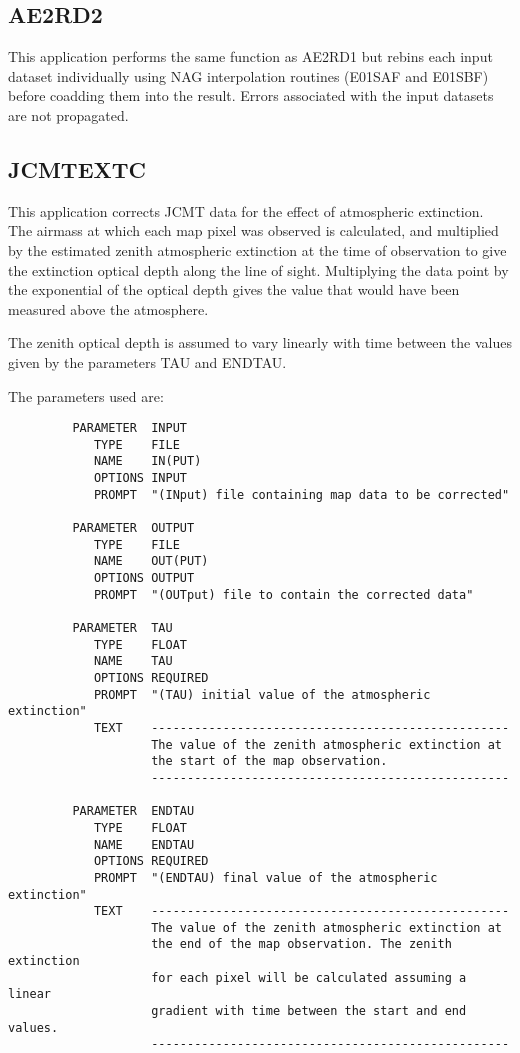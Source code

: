 \subsection{AE2RD2}

This application performs the same function as AE2RD1 but rebins each
input dataset individually using NAG interpolation routines (E01SAF
and E01SBF) before coadding them into the result. Errors associated
with the input datasets are not propagated.

\subsection{JCMTEXTC}

This application corrects JCMT data for the effect of  atmospheric
extinction. The airmass at which each map pixel was  observed is
calculated, and multiplied by the estimated zenith  atmospheric
extinction at the time of observation to give the  extinction optical
depth along the line of sight. Multiplying the data point by the
exponential of the optical depth gives  the value that would have been
measured above the atmosphere. 

The zenith optical depth is assumed to vary linearly with  time
between the values given by the parameters TAU and ENDTAU.

The parameters used are:

\begin{small}
\begin{verbatim}
         PARAMETER  INPUT
            TYPE    FILE
            NAME    IN(PUT)
            OPTIONS INPUT
            PROMPT  "(INput) file containing map data to be corrected"

         PARAMETER  OUTPUT
            TYPE    FILE
            NAME    OUT(PUT)
            OPTIONS OUTPUT
            PROMPT  "(OUTput) file to contain the corrected data"

         PARAMETER  TAU
            TYPE    FLOAT
            NAME    TAU
            OPTIONS REQUIRED
            PROMPT  "(TAU) initial value of the atmospheric extinction"
            TEXT    --------------------------------------------------
                    The value of the zenith atmospheric extinction at
                    the start of the map observation.
                    --------------------------------------------------

         PARAMETER  ENDTAU
            TYPE    FLOAT
            NAME    ENDTAU
            OPTIONS REQUIRED
            PROMPT  "(ENDTAU) final value of the atmospheric extinction"
            TEXT    --------------------------------------------------
                    The value of the zenith atmospheric extinction at
                    the end of the map observation. The zenith extinction
                    for each pixel will be calculated assuming a linear 
                    gradient with time between the start and end values.
                    --------------------------------------------------
\end{verbatim}
\end{small}

